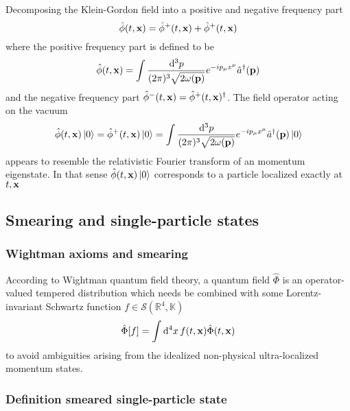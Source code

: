 Decomposing the Klein-Gordon field into a positive and negative frequency part
\begin{equation}
	\hat\phi(t,\vb{x})
	=
	\hat\phi^+(t,\vb{x})
	+
	\hat\phi^+(t,\vb{x})
\end{equation}
where the positive frequency part is defined to be
\begin{equation}
	\hat\phi(t,\vb{x})
	=
	\int\frac{\dd[3]{p}}{(2\pi)^3\sqrt{2\omega(\vb{p})}}
	e^{-ip_\mu x^\mu}
	\hat{a}^\dagger(\vb{p})
\end{equation}
and the negative frequency part $\hat\phi^-(t,\vb{x})=\hat\phi^+(t,\vb{x})^\dagger$.
The field operator acting on the vacuum
\begin{equation}
	\hat\phi(t,\vb{x})\ket{0}
	=
	\hat\phi^+(t,\vb{x})\ket{0}
	=
	\int\frac{\dd[3]{p}}{(2\pi)^3\sqrt{2\omega(\vb{p})}}
	e^{-ip_\mu x^\mu}
	\hat{a}^\dagger(\vb{p})
	\ket{0}
\end{equation}
appears to resemble the relativistic Fourier transform of an momentum eigenstate.
In that sense $\hat\phi(t,\vb{x})\ket{0}$ corresponds to a particle localized exactly at $t,\vb{x}$

\subsection{Smearing and single-particle states}

\subsubsection{Wightman axioms and smearing}

According to Wightman quantum field theory, a quantum field $\hat\Phi$ is an operator-valued tempered distribution which needs be combined with some Lorentz-invariant Schwartz function $f\in\mathcal{S}(\mathbb{R}^4,\mathbb{K})$
\begin{equation}
	\hat\Phi[f]
	=
	\int\dd[4]{x}f(t,\vb{x})\hat\Phi(t,\vb{x})	
\end{equation}
to avoid ambiguities arising from the idealized non-physical ultra-localized momentum states.

\subsubsection{Definition smeared single-particle state}

